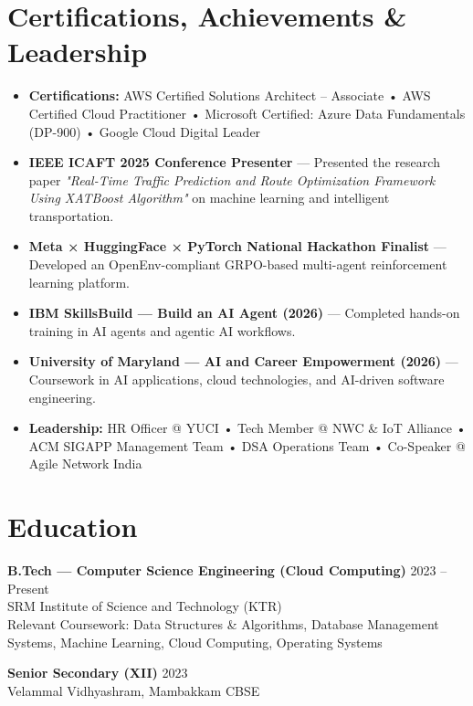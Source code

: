 \documentclass[9pt]{article}
\begin{document}

\section*{Certifications, Achievements \& Leadership}

\begin{itemize}

\item \textbf{Certifications:} AWS Certified Solutions Architect – Associate • AWS Certified Cloud Practitioner • Microsoft Certified: Azure Data Fundamentals (DP-900) • Google Cloud Digital Leader

\item \textbf{IEEE ICAFT 2025 Conference Presenter} — Presented the research paper \textit{"Real-Time Traffic Prediction and Route Optimization Framework Using XATBoost Algorithm"} on machine learning and intelligent transportation.

\item \textbf{Meta × HuggingFace × PyTorch National Hackathon Finalist} — Developed an OpenEnv-compliant GRPO-based multi-agent reinforcement learning platform.

\item \textbf{IBM SkillsBuild — Build an AI Agent (2026)} — Completed hands-on training in AI agents and agentic AI workflows.

\item \textbf{University of Maryland — AI and Career Empowerment (2026)} — Coursework in AI applications, cloud technologies, and AI-driven software engineering.

\item \textbf{Leadership:} HR Officer @ YUCI • Tech Member @ NWC \& IoT Alliance • ACM SIGAPP Management Team • DSA Operations Team • Co-Speaker @ Agile Network India

\end{itemize}
\section*{Education}

\textbf{B.Tech — Computer Science Engineering (Cloud Computing)} \hfill 2023 -- Present \\
SRM Institute of Science and Technology (KTR) \\
Relevant Coursework: Data Structures \& Algorithms, Database Management Systems, Machine Learning, Cloud Computing, Operating Systems

\vspace{2pt}

\textbf{Senior Secondary (XII)} \hfill 2023 \\
Velammal Vidhyashram, Mambakkam CBSE
\end{document}
